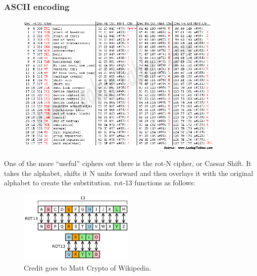 \documentclass{beamer}
\begin{document}
\begin{frame}
    \frametitle{ASCII encoding}
    \begin{figure}[h]
        \includegraphics[width=0.9\textwidth]{asciifull}
    \end{figure}
\end{frame}

\begin{frame}

    One of the more ``useful'' ciphers out there is the rot-N cipher, or Caesar
    Shift. It takes the alphabet, shifts it N units forward and then overlays it
    with the original alphabet to create the substitution. rot-13 functions as
    follows:

    \begin{figure}[h]
        \begin{center}
            \includegraphics[width=0.5\textwidth]{ROT13}
        \end{center}
        \caption{Credit goes to Matt Crypto of Wikipedia.}
    \end{figure}
\end{frame}
\end{document}
